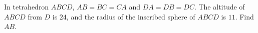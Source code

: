In tetrahedron $ABCD$, $AB=BC=CA$ and $DA=DB=DC$. The altitude of $ABCD$ from $D$ is $24$, and the radius of the inscribed sphere of $ABCD$ is $11$. Find $AB$.
